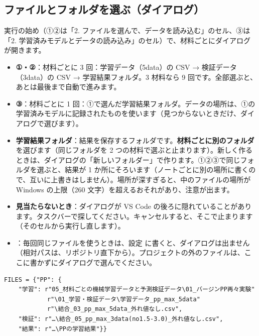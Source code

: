 \documentclass[paper=a4paper,fontsize=10.5pt,line_length=44zw,number_of_lines=38]{jlreq}
\newcommand{\file}[1]{\texttt{\detokenize{#1}}}
\newenvironment{points}{\begin{itemize}[label=$\triangleright$,leftmargin=1.5\zw,itemsep=0.3ex,topsep=0.5ex,parsep=0pt]}{\end{itemize}}
\newcommand{\pt}[1]{\item \textbf{#1}：}
\begin{document}
\subsection{ファイルとフォルダを選ぶ（ダイアログ）}
実行の始め（①②は「2. ファイルを選んで、データを読み込む」のセル、③は「2. 学習済みモデルとデータの読み込み」のセル）で、材料ごとにダイアログが開きます。
\begin{points}
\pt{①・②}材料ごとに 3 回：学習データ（5data）の CSV → 検証データ（3data）の CSV → 学習結果フォルダ。3 材料なら 9 回です。全部選ぶと、あとは最後まで自動で進みます。
\pt{③}材料ごとに 1 回：①で選んだ学習結果フォルダ。データの場所は、①の学習済みモデルに記録されたものを使います（見つからないときだけ、ダイアログで選びます）。
\pt{学習結果フォルダ}結果を保存するフォルダです。\textbf{材料ごとに別のフォルダ}を選びます（同じフォルダを 2 つの材料で選ぶと止まります）。新しく作るときは、ダイアログの「新しいフォルダー」で作ります。①②③で同じフォルダを選ぶと、結果が 1 か所にそろいます（ノートごとに別の場所に書くので、互いに上書きはしません）。場所が深すぎると、中のファイルの場所が Windows の上限（260 文字）を超えるおそれがあり、注意が出ます。
\pt{見当たらないとき}ダイアログが VS Code の後ろに隠れていることがあります。タスクバーで探してください。キャンセルすると、そこで止まります（そのセルから実行し直します）。
\pt{\file{FILES}}毎回同じファイルを使うときは、設定 \file{FILES} に書くと、ダイアログは出ません（相対パスは、リポジトリ直下から）。プロジェクトの外のファイルは、ここに書かずにダイアログで選んでください。
\end{points}
\begin{Verbatim}[frame=single,fontsize=\small,xleftmargin=1em]
FILES = {"PP": {
    "学習": r"05_材料ごとの機械学習データと予測検証データ\01_バージンPP再々実験"
            r"\01_学習・検証データ\学習データ_pp_max_5data"
            r"\結合_03_pp_max_5data_外れ値なし.csv",
    "検証": r"…\結合_05_pp_max_3data(no1.5-3.0)_外れ値なし.csv",
    "結果": r"…\PPの学習結果"}}
\end{Verbatim}
\end{document}
